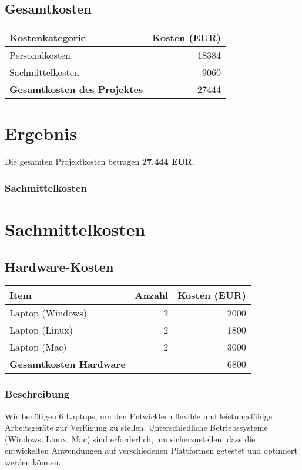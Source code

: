 \subsection*{Gesamtkosten}
\begin{tabular}{lr}
  \toprule
  \textbf{Kostenkategorie} & \textbf{Kosten (EUR)} \\
  \midrule
  Personalkosten & 18384 \\
  Sachmittelkosten & 9060 \\
  \midrule
  \textbf{Gesamtkosten des Projektes} & 27444 \\
  \bottomrule
\end{tabular}

\section*{Ergebnis}
Die gesamten Projektkosten betragen \textbf{27.444 EUR}.


\subsubsection{Sachmittelkosten}\label{sachmittelkosten}

\section*{Sachmittelkosten}

\subsection*{Hardware-Kosten}
\begin{tabular}{lrr}
  \toprule
  \textbf{Item} & \textbf{Anzahl} & \textbf{Kosten (EUR)} \\
  \midrule
  Laptop (Windows) & 2 & 2000 \\
  Laptop (Linux) & 2 & 1800 \\
  Laptop (Mac) & 2 & 3000 \\
  \midrule
  \textbf{Gesamtkosten Hardware} & & 6800 \\
  \bottomrule
\end{tabular}

\subsubsection*{Beschreibung}
Wir benötigen 6 Laptops, um den Entwicklern flexible und leistungsfähige Arbeitsgeräte zur Verfügung zu stellen. Unterschiedliche Betriebssysteme (Windows, Linux, Mac) sind erforderlich, um sicherzustellen, dass die entwickelten Anwendungen auf verschiedenen Plattformen getestet und optimiert werden können.


